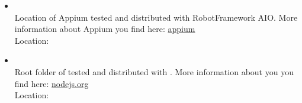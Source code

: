 \begin{itemize}
   \item {}\\
         Location of Appium tested and distributed with RobotFramework AIO. More information about Appium you find here:
         \href{https://appium.io/}{appium}\\
         Location: 

   \item {}\\
         Root folder of  tested and distributed with \rfw. More information about  you you find here:
         \href{https://nodejs.org/en/}{nodejs.org}\\
         Location: 

\end{itemize}
